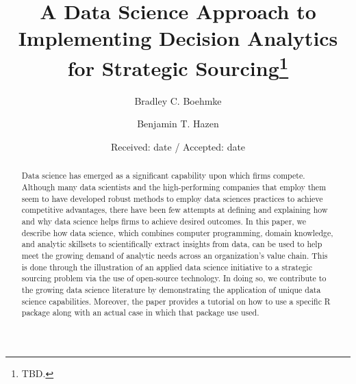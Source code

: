 \documentclass[twocolumn]{svjour3}       %
\begin{document}
\title{A Data Science Approach to Implementing Decision Analytics for Strategic Sourcing\thanks{TBD.}}


\author{
  Bradley C. Boehmke \and
  Benjamin T. Hazen
}



\date{Received: date / Accepted: date}


\maketitle


\begin{abstract}

Data science has emerged as a significant capability upon which firms compete. Although many data scientists and the high-performing companies that employ them seem to have developed robust methods to employ data sciences practices to achieve competitive advantages, there have been few attempts at defining and explaining how and why data science helps firms to achieve desired outcomes.  In this paper, we describe how data science, which combines computer programming, domain knowledge, and analytic skillsets to scientifically extract insights from data, can be used to help meet the growing demand of analytic needs across an organization's value chain. This is done through the illustration of an applied data science initiative to a strategic sourcing problem via the use of open-source technology. In doing so, we contribute to the growing data science literature by demonstrating the application of unique data science capabilities. Moreover, the paper provides a tutorial on how to use a specific R package along with an actual case in which that package use used.


\end{abstract}
\end{document}
